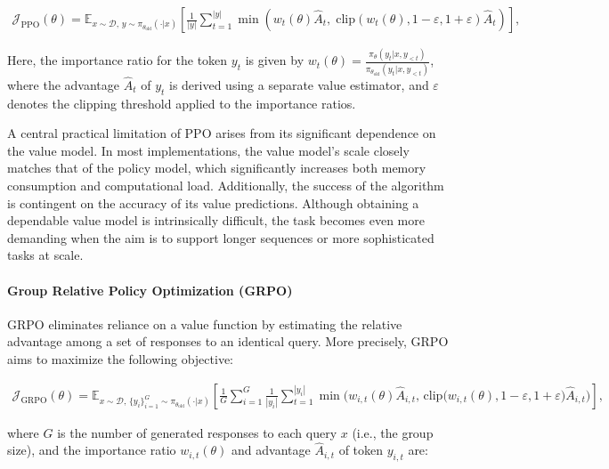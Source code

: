\begin{align}
\mathcal{J}_\text{PPO}(\theta) = \mathbb{E}_{ x \sim \mathcal{D},\, y \sim \pi_{\theta_\text{old}}( \cdot | x) }
\left[ \frac{1}{|y|} \sum_{t=1}^{|y|} 
\min \left( w_{t}(\theta) \widehat{A}_{t}, \; \mathrm{clip} \left( w_{t}(\theta), 1 - {\varepsilon}, 1 + {\varepsilon}\right) \widehat{A}_{t} \right)
\right],
\end{align}

Here, the importance ratio for the token $y_t$ is given by $ w_{t}(\theta) = \frac{ \pi_{\theta} (y_{t} | x, y_{<t}) }{ \pi_{\theta_\text{old}} (y_{t} | x,y_{<t})} $, where the advantage $\widehat{A}_{t}$ of $y_t$ is derived using a separate value estimator, and $\varepsilon$ denotes the clipping threshold applied to the importance ratios.

A central practical limitation of PPO arises from its significant dependence on the value model. In most implementations, the value model’s scale closely matches that of the policy model, which significantly increases both memory consumption and computational load. Additionally, the success of the algorithm is contingent on the accuracy of its value predictions. Although obtaining a dependable value model is intrinsically difficult, the task becomes even more demanding when the aim is to support longer sequences or more sophisticated tasks at scale.

\paragraph{Group Relative Policy Optimization (GRPO)} GRPO \citep{grpo} eliminates reliance on a value function by estimating the relative advantage among a set of responses to an identical query. More precisely, GRPO aims to maximize the following objective:

\begin{align}
\label{equ:grpo}
\mathcal{J}_\text{GRPO}(\theta) = \mathbb{E}_{ x \sim \mathcal{D},\, \{y_i\}_{i=1}^G \sim \pi_{\theta_\text{old}}( \cdot | x) }
\left[ \frac{1}{G} \sum_{i=1}^{G} \frac{1}{|y_i|} \sum_{t=1}^{|y_i|} 
\min \bigg( w_{i,t}(\theta) \widehat{A}_{i,t},\, \mathrm{clip} \big( w_{i,t}(\theta), 1 - {\varepsilon}, 1 + {\varepsilon}\big) \widehat{A}_{i,t} \bigg)
\right],
\end{align}

where $G$ is the number of generated responses to each query $x$ (i.e., the group size), and the importance ratio $w_{i,t}(\theta)$ and advantage $\widehat{A}_{i,t}$ of token $y_{i,t}$ are:

